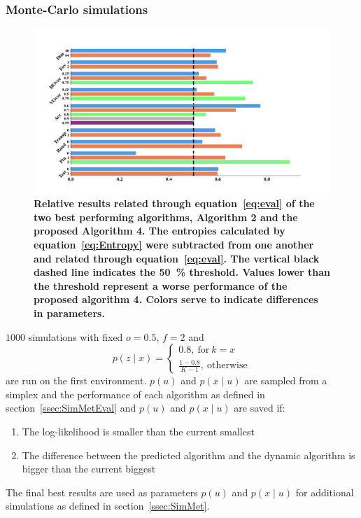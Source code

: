 \documentclass[twocolumn,letterpaper]{IEEEAerospaceCLS}  %
\begin{document}
\subsubsection{Monte-Carlo simulations} \label{ssec:SimMetMC}
\begin{figure}[t]
    \centering
    \includegraphics[width=\textwidth]{Results-16-TNR.png}
    \caption{\bf{
        Relative results related through equation~\ref{eq:eval} of the two best performing algorithms, Algorithm 2 and the proposed Algorithm 4. The entropies calculated by equation~\ref{eq:Entropy} were subtracted from one another and related through equation~\ref{eq:eval}. The vertical black dashed line indicates the 50~\% threshold. Values lower than the threshold represent a worse performance of the proposed algorithm 4. Colors serve to indicate differences in parameters. 
    }}
    \label{fig:Res}
\end{figure}
$1000$ simulations with fixed $o=0.5$, $f=2$ and
\begin{equation} \nonumber
    p(z\mid x)=
    \begin{cases}
        0.8,~\text{for}~k=x \\
        \frac{1-0.8}{K-1},~\text{otherwise}
    \end{cases}
\end{equation}
are run on the first environment. $p(u)$ and $p(x\mid u)$ are sampled from a simplex and the performance of each algorithm as defined in section~\ref{ssec:SimMetEval} and $p(u)$ and $p(x\mid u)$ are saved if:
\begin{enumerate}
    \item The log-likelihood is smaller than the current smallest
    \item The difference between the predicted algorithm and the dynamic algorithm is bigger than the current biggest
\end{enumerate}
The final best results are used as parameters $p(u)$ and $p(x\mid u)$ for additional simulations as defined in section~\ref{ssec:SimMet}.
\end{document}
